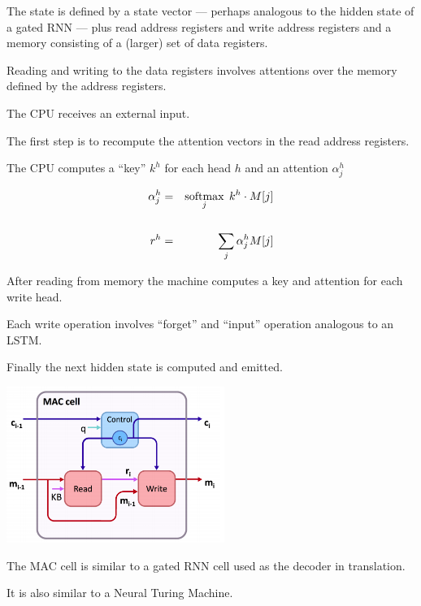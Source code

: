 {

The state is defined by a state vector --- perhaps analogous to the hidden state of a gated RNN --- plus read address registers
and write address registers and a memory consisting of a (larger) set of data registers.

\vfill
Reading and writing to the data registers involves attentions over the memory defined by the address registers.



\vfill
The CPU receives an external input.

\vfill
The first step is to recompute the attention vectors in the read address registers.

\vfill
The CPU computes a ``key'' $k^h$ for each head $h$ and an attention $\alpha_j^h$

\begin{eqnarray*}
  \alpha^h_j & = & \operatorname*{softmax}_j\;k^h \cdot M[j] \\
  \\
  r^h & = & \sum_j \alpha_j^h M[j]
\end{eqnarray*}


After reading from memory the machine computes a key and attention for each write head.

\vfill
Each write operation involves ``forget'' and ``input'' operation analogous to an LSTM.

\vfill
Finally the next hidden state is computed and emitted.


\centerline{\includegraphics[height = 2.0in]{../images/MACcell}}

The MAC cell is similar to a gated RNN cell used as the decoder in translation.

\vfill
It is also similar to a Neural Turing Machine.

}
